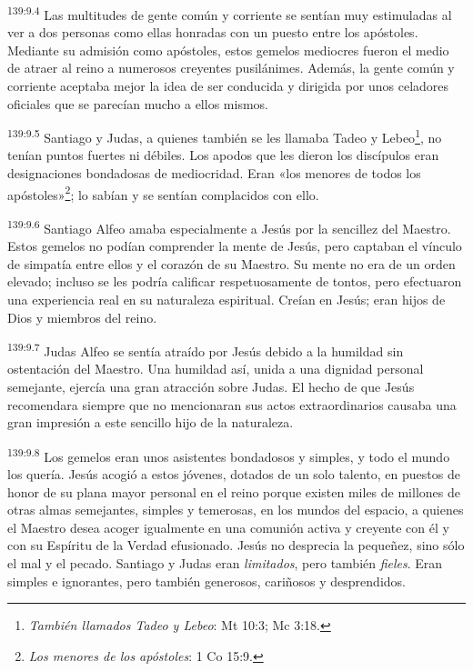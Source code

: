 \par 
\textsuperscript{139:9.4} Las multitudes de gente común y corriente se sentían muy estimuladas al ver a dos personas como ellas honradas con un puesto entre los apóstoles. Mediante su admisión como apóstoles, estos gemelos mediocres fueron el medio de atraer al reino a numerosos creyentes pusilánimes. Además, la gente común y corriente aceptaba mejor la idea de ser conducida y dirigida por unos celadores oficiales que se parecían mucho a ellos mismos.

\par 
\textsuperscript{139:9.5} Santiago y Judas, a quienes también se les llamaba Tadeo y Lebeo\footnote{\textit{También llamados Tadeo y Lebeo}: Mt 10:3; Mc 3:18.}, no tenían puntos fuertes ni débiles. Los apodos que les dieron los discípulos eran designaciones bondadosas de mediocridad. Eran «los menores de todos los apóstoles»\footnote{\textit{Los menores de los apóstoles}: 1 Co 15:9.}; lo sabían y se sentían complacidos con ello.

\par 
\textsuperscript{139:9.6} Santiago Alfeo amaba especialmente a Jesús por la sencillez del Maestro. Estos gemelos no podían comprender la mente de Jesús, pero captaban el vínculo de simpatía entre ellos y el corazón de su Maestro. Su mente no era de un orden elevado; incluso se les podría calificar respetuosamente de tontos, pero efectuaron una experiencia real en su naturaleza espiritual. Creían en Jesús; eran hijos de Dios y miembros del reino.

\par 
\textsuperscript{139:9.7} Judas Alfeo se sentía atraído por Jesús debido a la humildad sin ostentación del Maestro. Una humildad así, unida a una dignidad personal semejante, ejercía una gran atracción sobre Judas. El hecho de que Jesús recomendara siempre que no mencionaran sus actos extraordinarios causaba una gran impresión a este sencillo hijo de la naturaleza.

\par 
\textsuperscript{139:9.8} Los gemelos eran unos asistentes bondadosos y simples, y todo el mundo los quería. Jesús acogió a estos jóvenes, dotados de un solo talento, en puestos de honor de su plana mayor personal en el reino porque existen miles de millones de otras almas semejantes, simples y temerosas, en los mundos del espacio, a quienes el Maestro desea acoger igualmente en una comunión activa y creyente con él y con su Espíritu de la Verdad efusionado. Jesús no desprecia la pequeñez, sino sólo el mal y el pecado. Santiago y Judas eran \textit{limitados}, pero también \textit{fieles}. Eran simples e ignorantes, pero también generosos, cariñosos y desprendidos.

